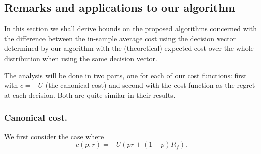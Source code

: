 \subsection{Remarks and applications to our algorithm}

In this section we shall derive bounds on the proposed algorithms concerned with the
difference between the in-sample average cost using the decision vector determined by our
algorithm with the (theoretical) expected cost over the whole distribution when using the
same decision vector. 

The analysis will be done in two parts, one for each of our cost functions: first with
$c=-U$ (the canonical cost) and second with the cost function as the regret at each
decision. Both are quite similar in their results. 

\subsubsection{Canonical cost.}

We first consider the case where 
\begin{equation}
  c(p,r) = -U(pr + (1-p)R_f).
\end{equation}

